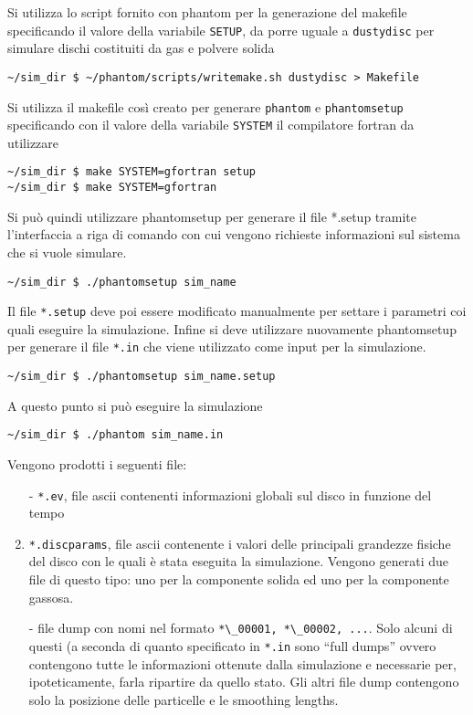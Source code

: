 \documentclass[DIN, pagenumber=false, fontsize=11pt, parskip=half]{scrartcl}
\begin{document}
Si utilizza lo script fornito con phantom per la generazione del makefile specificando il valore della variabile \lstinline{SETUP}, da porre uguale a \lstinline{dustydisc} per simulare dischi costituiti da gas e polvere solida
\begin{lstlisting}
~/sim_dir $ ~/phantom/scripts/writemake.sh dustydisc > Makefile       
\end{lstlisting}

Si utilizza il makefile così creato per generare \lstinline{phantom} e \lstinline{phantomsetup} specificando con il valore della variabile \lstinline{SYSTEM} il compilatore fortran da utilizzare

\begin{lstlisting}
~/sim_dir $ make SYSTEM=gfortran setup
~/sim_dir $ make SYSTEM=gfortran 
\end{lstlisting}

Si può quindi utilizzare phantomsetup per generare il file *.setup tramite l'interfaccia a riga di comando con cui vengono richieste informazioni sul sistema che si vuole simulare.

\begin{lstlisting}
~/sim_dir $ ./phantomsetup sim_name      
\end{lstlisting}

Il file \lstinline{*.setup} deve poi essere modificato manualmente per settare i parametri coi quali eseguire la simulazione. Infine si deve utilizzare nuovamente phantomsetup per generare il file \lstinline{*.in} che viene utilizzato come input per la simulazione.

\begin{lstlisting}
~/sim_dir $ ./phantomsetup sim_name.setup     
\end{lstlisting}

A questo punto si può eseguire la simulazione

\begin{lstlisting}
~/sim_dir $ ./phantom sim_name.in    
\end{lstlisting}

Vengono prodotti i seguenti file:
\begin{enumerate}
 \item[-] \lstinline{*.ev}, file ascii contenenti informazioni globali sul disco in funzione del tempo 
 \item[-] \lstinline{*.discparams}, file ascii contenente i valori delle principali grandezze fisiche del disco con le quali è stata eseguita la simulazione. Vengono generati due file di questo tipo: uno per la componente solida ed uno per la componente gassosa.
 \item[-] file dump con nomi nel formato \lstinline{*\_00001, *\_00002, ...}. Solo alcuni di questi (a seconda di quanto specificato in \lstinline{*.in} sono ``full dumps'' ovvero contengono tutte le informazioni ottenute dalla simulazione e necessarie per, ipoteticamente, farla ripartire da quello stato. Gli altri file dump contengono solo la posizione delle particelle e le smoothing lengths.
\end{enumerate}
\end{document}
